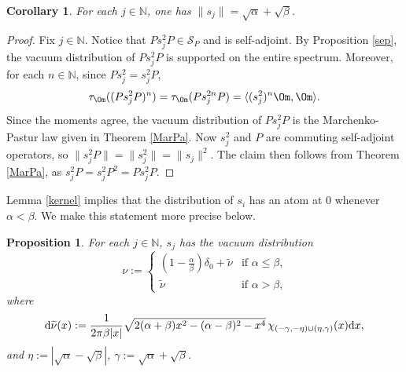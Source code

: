 \documentclass[12pt]{amsart}
\numberwithin{equation}{section}
\def\bn{{\mathbb N}}
\def\a{\alpha}
\def\b{\beta}
\def\n{\nu}
\def\t{\tau}
\newtheorem{cor}[thm]{Corollary}
\newtheorem{prop}[thm]{Proposition}
\theoremstyle{definition}
\def\di{\mathop{\rm d}\!}
\def\di{{\rm d}}
\begin{document}
\begin{cor}\label{norm}
For each $j\in\bn$, one has $\|s_j\| = \sqrt{\a} + \sqrt{\b}$.
\end{cor}
\begin{proof}
Fix $j\in\bn$. Notice that $P s_j^2 P \in \mathcal{S}_P$ and is self-adjoint. By Proposition \ref{sep}, the vacuum distribution of $P s_j^2 P$ is supported on the entire spectrum. Moreover, for each $n\in\bn$, since $P s_j^2 = s_j^2 P$,
\[
\t_\Om((P s_j^2 P)^n) = \t_\Om(P s_j^{2n} P) = \langle (s_j^2)^n \Om, \Om \rangle.
\]
Since the moments agree, the vacuum distribution of $P s_j^2 P$ is the Marchenko-Pastur law given in Theorem \ref{MarPa}. Now $s_j^2$ and $P$ are commuting self-adjoint operators, so $\|s_j^2 P\| = \|s_j^2\| = \|s_j\|^2$. The claim then follows from Theorem \ref{MarPa}, as $s_j^2 P = s_j^2 P^2 = P s_j^2 P$.
\end{proof}
Lemma \ref{kernel} implies that the distribution of $s_i$ has an atom at $0$ whenever $\a<\b$. We make this statement more precise below.
\begin{prop}\label{distri}
For each $j\in\bn$, $s_j$ has the vacuum distribution
\[
\n :=
\begin{cases}
(1 - \frac{\a}{\b}) \delta_0 + \widetilde{\nu} & \text{if $\a \le \b$,} \\
\widetilde{\nu} & \text{if $\a > \b$,}
\end{cases}
\]
where
\[
\di \widetilde{\nu}(x) := \frac{1}{2\pi \b |x|} \sqrt{2(\alpha+\beta)x^2 - (\alpha-\beta)^2 - x^4}\, \chi_{(-\gamma, -\eta) \cup (\eta, \gamma)}(x) \di x,
\]
and $\eta := |\sqrt{\alpha} - \sqrt{\b}|$, $\gamma := \sqrt{\alpha} + \sqrt{\b}$.
\end{prop}
\end{document}
